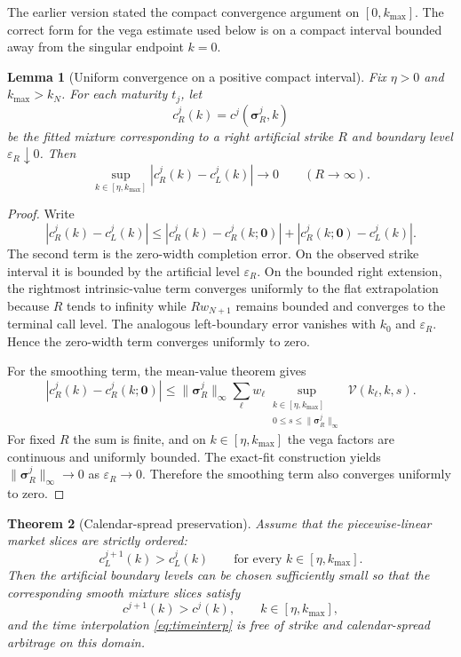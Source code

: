 \documentclass[11pt]{article}
\newtheorem{theorem}{Theorem}[section]
\newtheorem{lemma}[theorem]{Lemma}
\newcommand{\eps}{\varepsilon}
\newcommand{\Vega}{\mathcal{V}}
\begin{document}
The earlier version \cite{elalaoui2023} stated the compact convergence argument on $[0,k_{\max}]$. The correct form for the vega estimate used below is on a compact interval bounded away from the singular endpoint $k=0$.

\begin{lemma}[Uniform convergence on a positive compact interval]\label{lem:calendaruniform}
Fix $\eta>0$ and $k_{\max}>k_N$. For each maturity $t_j$, let
\[
c^j_{R}(k)=c^j(\bm\sigma^j_R,k)
\]
be the fitted mixture corresponding to a right artificial strike $R$ and boundary level $\eps_R\downarrow0$. Then
\[
\sup_{k\in[\eta,k_{\max}]}
|c_R^j(k)-c_L^j(k)|\longrightarrow0
\qquad (R\to\infty).
\]
\end{lemma}

\begin{proof}
Write
\[
|c_R^j(k)-c_L^j(k)|
\le
|c_R^j(k)-c_R^j(k;\bm0)|
+
|c_R^j(k;\bm0)-c_L^j(k)|.
\]
The second term is the zero-width completion error. On the observed strike interval it is bounded by the artificial level $\eps_R$. On the bounded right extension, the rightmost intrinsic-value term converges uniformly to the flat extrapolation because $R$ tends to infinity while $Rw_{N+1}$ remains bounded and converges to the terminal call level. The analogous left-boundary error vanishes with $k_0$ and $\eps_R$. Hence the zero-width term converges uniformly to zero.

For the smoothing term, the mean-value theorem gives
\[
|c_R^j(k)-c_R^j(k;\bm0)|
\le
\|\bm\sigma_R^j\|_\infty
\sum_{\ell}w_\ell
\sup_{\substack{k\in[\eta,k_{\max}]\\0\le s\le\|\bm\sigma_R^j\|_\infty}}
\Vega(k_\ell,k,s).
\]
For fixed $R$ the sum is finite, and on $k\in[\eta,k_{\max}]$ the vega factors are continuous and uniformly bounded. The exact-fit construction yields $\|\bm\sigma_R^j\|_\infty\to0$ as $\eps_R\to0$. Therefore the smoothing term also converges uniformly to zero.
\end{proof}

\begin{theorem}[Calendar-spread preservation]\label{thm:calendar}
Assume that the piecewise-linear market slices are strictly ordered:
\[
c_L^{j+1}(k)>c_L^j(k)
\qquad
\text{for every }k\in[\eta,k_{\max}].
\]
Then the artificial boundary levels can be chosen sufficiently small so that the corresponding smooth mixture slices satisfy
\[
c^{j+1}(k)>c^j(k),
\qquad k\in[\eta,k_{\max}],
\]
and the time interpolation \eqref{eq:timeinterp} is free of strike and calendar-spread arbitrage on this domain.
\end{theorem}
\end{document}
